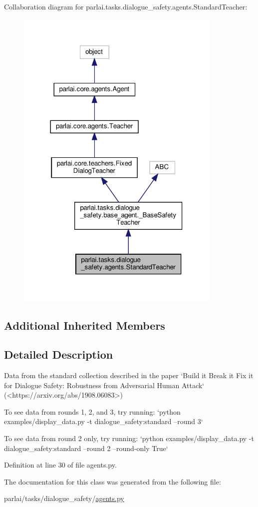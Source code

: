 Collaboration diagram for parlai.\+tasks.\+dialogue\+\_\+safety.\+agents.\+Standard\+Teacher\+:
\nopagebreak
\begin{figure}[H]
\begin{center}
\leavevmode
\includegraphics[width=278pt]{df/da8/classparlai_1_1tasks_1_1dialogue__safety_1_1agents_1_1StandardTeacher__coll__graph}
\end{center}
\end{figure}
\subsection*{Additional Inherited Members}


\subsection{Detailed Description}
\begin{DoxyVerb}Data from the standard collection described in the paper `Build it Break it Fix it
for Dialogue Safety: Robustness from Adversarial Human Attack`
(<https://arxiv.org/abs/1908.06083>)

To see data from rounds 1, 2, and 3, try running:
`python examples/display_data.py -t dialogue_safety:standard --round 3`

To see data from round 2 only, try running:
`python examples/display_data.py -t dialogue_safety:standard --round 2
 --round-only True`
\end{DoxyVerb}
 

Definition at line 30 of file agents.\+py.



The documentation for this class was generated from the following file\+:\begin{DoxyCompactItemize}
\item 
parlai/tasks/dialogue\+\_\+safety/\hyperlink{parlai_2tasks_2dialogue__safety_2agents_8py}{agents.\+py}\end{DoxyCompactItemize}

